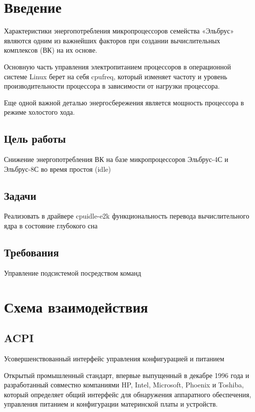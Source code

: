 \documentclass{article}
\begin{document}


\tableofcontents

\newpage

\section{Введение}

Характеристики энергопотребления микропроцессоров семейства «Эльбрус»
являются одним из важнейших факторов при создании вычислительных комплексов (ВК)
на их основе.

Основную часть управления электропитанием процессоров в операционной системе Linux берет на себя cpufreq, который изменяет частоту и уровень производительности процессора в зависимости от нагрузки процессора.

Еще одной важной деталью энергосбережения является мощность процессора в режиме холостого хода.

\subsection{Цель работы}
Снижение энергопотребления ВК на базе микропроцессоров Эльбрус-4С и Эльбрус-8С во время простоя (idle)
\subsection{Задачи}
Реализовать в драйвере cpuidle-e2k функциональность перевода вычислительного ядра в состояние глубокого сна
\subsection{Требования}
Управление подсистемой посредством команд

\newpage
\section{Схема взаимодействия}

\subsection{ACPI}
Усовершенствованный интерфейс управления конфигурацией и питанием

Открытый промышленный стандарт, впервые выпущенный в декабре 1996 года и разработанный совместно компаниями HP, Intel, Microsoft, Phoenix и Toshiba, который определяет общий интерфейс для обнаружения аппаратного обеспечения, управления питанием и конфигурации материнской платы и устройств.
\end{document}
